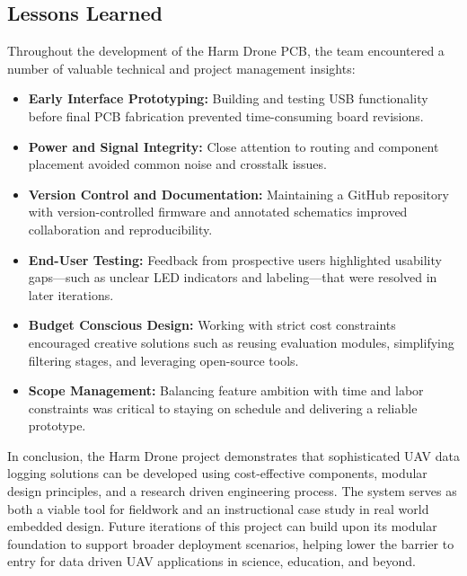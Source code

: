 \documentclass[12pt]{article}
\begin{document}
\subsection{Lessons Learned}

Throughout the development of the Harm Drone PCB, the team encountered a number of valuable technical and project management insights:

\begin{itemize}
\item \textbf{Early Interface Prototyping:} Building and testing USB functionality before final PCB fabrication prevented time-consuming board revisions.
\item \textbf{Power and Signal Integrity:} Close attention to routing and component placement avoided common noise and crosstalk issues.
\item \textbf{Version Control and Documentation:} Maintaining a GitHub repository with version-controlled firmware and annotated schematics improved collaboration and reproducibility.
\item \textbf{End-User Testing:} Feedback from prospective users highlighted usability gaps—such as unclear LED indicators and labeling—that were resolved in later iterations.
\item \textbf{Budget Conscious Design:} Working with strict cost constraints encouraged creative solutions such as reusing evaluation modules, simplifying filtering stages, and leveraging open-source tools.
\item \textbf{Scope Management:} Balancing feature ambition with time and labor constraints was critical to staying on schedule and delivering a reliable prototype.
\end{itemize}

\par In conclusion, the Harm Drone project demonstrates that sophisticated UAV data logging solutions can be developed using cost-effective components, modular design principles, and a research driven engineering process. The system serves as both a viable tool for fieldwork and an instructional case study in real world embedded design. Future iterations of this project can build upon its modular foundation to support broader deployment scenarios, helping lower the barrier to entry for data driven UAV applications in science, education, and beyond.

\end{document}
